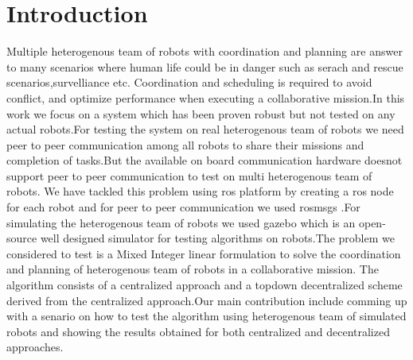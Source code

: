 \documentclass[conference]{IEEEtran}
\begin{document}




%
\IEEEpeerreviewmaketitle



\section{Introduction}
Multiple heterogenous team of robots with coordination and planning are answer to many scenarios where human life could be in danger such as serach and rescue scenarios,survelliance etc. Coordination and scheduling is required to avoid conflict, and optimize performance when executing a collaborative mission.In this work we focus on a system which has been proven robust but not tested on any actual robots.For testing the system on real heterogenous team of robots we need peer to peer communication among all robots to share their missions and completion of tasks.But the available on board communication hardware doesnot support peer to peer communication to test on multi heterogenous team of robots. We have tackled this problem using ros platform by creating a ros node for each robot and for peer to peer communication we used rosmsgs .For simulating the heterogenous team of robots we used gazebo which is an open-source well designed simulator for testing algorithms on robots.The problem we considered to test is a Mixed Integer linear formulation to solve the coordination and planning of heterogenous team of robots in a collaborative mission.
The algorithm consists of a centralized approach and a topdown decentralized scheme derived from the centralized approach.Our main contribution include comming up with a senario on how to test the algorithm using heterogenous team of simulated robots and showing the results obtained for both centralized and decentralized approaches.  
\end{document}
